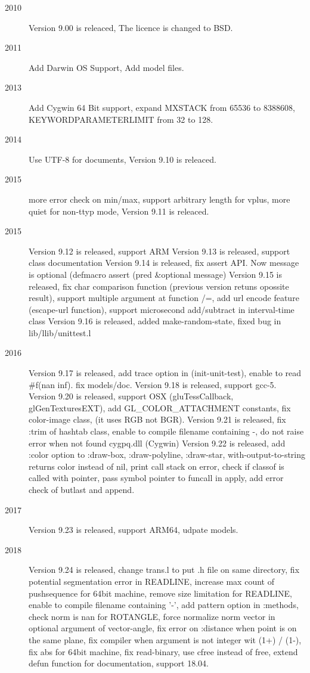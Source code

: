 \begin{description}
\item[2010] Version 9.00 is releaced, The licence is changed to BSD.
\item[2011] Add Darwin OS Support, Add model files.
\item[2013] Add Cygwin 64 Bit support, expand MXSTACK from 65536 to 8388608, KEYWORDPARAMETERLIMIT from 32 to 128.
\item[2014] Use UTF-8 for documents, Version 9.10 is releaced.
\item[2015] more error check on min/max, support arbitrary length for vplus, more quiet for non-ttyp mode, Version 9.11 is releaced.
\item[2015] Version 9.12 is released, support ARM
            Version 9.13 is released, support class documentation
            Version 9.14 is released, fix assert API. Now message is optional (defmacro assert (pred \&optional message)
            Version 9.15 is released, fix char comparison function (previous version retuns opossite result), support multiple argument at function /=,  add url encode feature (escape-url function), support microsecond add/subtract in interval-time class
            Version 9.16 is released, added make-random-state, fixed bug in lib/llib/unittest.l
\item[2016] Version 9.17 is released, add trace option in (init-unit-test), enable to read \#f(nan inf). fix models/doc.
            Version 9.18 is released, support gcc-5.
            Version 9.20 is released, support OSX (gluTessCallback, glGenTexturesEXT), add GL\_COLOR\_ATTACHMENT constants, fix color-image class, (it uses RGB not BGR).
            Version 9.21 is released, fix :trim of hashtab class, enable to compile filename containing -, do not raise error when not found cygpq.dll (Cygwin)
            Version 9.22 is released, add :color option to :draw-box, :draw-polyline, :draw-star, with-output-to-string returns color instead of nil, print call stack on error, check if classof is called with pointer, pass symbol pointer to funcall in apply, add error check of butlast and append.
\item[2017] Version 9.23 is released, support ARM64, udpate models.
\item[2018] Version 9.24 is released, change trans.l to put .h file on same directory, fix potential segmentation error in READLINE, increase max count of pushsequence for 64bit machine, remove size limitation for READLINE, enable to compile filename containing '-', add pattern option in :methods, check norm is nan for ROTANGLE, force normalize norm vector in optional argument of vector-angle, fix error on :distance when point is on the same plane, fix compiler when argument is not integer wit (1+) / (1-), fix abs for 64bit machine, fix read-binary, use cfree instead of free, extend defun function for documentation, support 18.04.

\end{description}
